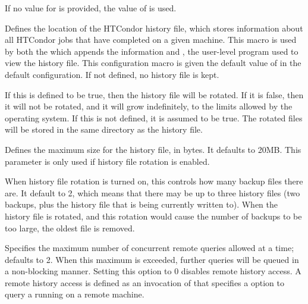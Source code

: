 \begin{description}
  If no value for  is provided, the value of 
  is used.


\label{param:History}
\item[\Macro{HISTORY}]
  Defines the
  location of the HTCondor history file, which stores information about
  all HTCondor jobs that have completed on a given machine.  This macro
  is used by both the  which appends the information
  and , the user-level program used to view
  the history file.
  This configuration macro is given the default value of
   in the default configuration.
  If not defined,
  no history file is kept.

\label{param:EnableHistoryRotation} 
\item[\Macro{ENABLE\_HISTORY\_ROTATION}]
  If this is defined to be true, then the
  history file will be rotated. If it is false, then it will not be
  rotated, and it will grow indefinitely, to the limits allowed by the
  operating system. If this is not defined, it is assumed to be
  true. The rotated files will be stored in the same directory as the
  history file. 

\label{param:MaxHistoryLog}
\item[\Macro{MAX\_HISTORY\_LOG}]
  Defines the maximum size for the history file, in bytes. It defaults
  to 20MB. This parameter is only used if history file rotation is
  enabled. 

\label{param:MaxHistoryRotations}
\item[\Macro{MAX\_HISTORY\_ROTATIONS}]
  When history file rotation is turned on, this controls how many
  backup files there are. It default to 2, which means that there may
  be up to three history files (two backups, plus the history file
  that is being currently written to). When the history file is
  rotated, and this rotation would cause the number of backups to be
  too large, the oldest file is removed. 

\label{param:HistoryHelperMaxConcurrency}
\item[\Macro{HISTORY\_HELPER\_MAX\_CONCURRENCY}]
  Specifies the maximum number of concurrent remote 
  queries allowed at a time; defaults to 2.  When this maximum is exceeded,
  further queries will be queued in a non-blocking manner. Setting this option
  to 0 disables remote history access. A remote history access is defined
  as an invocation of  that specifies a  option
  to query a  running on a remote machine.


\end{description}
